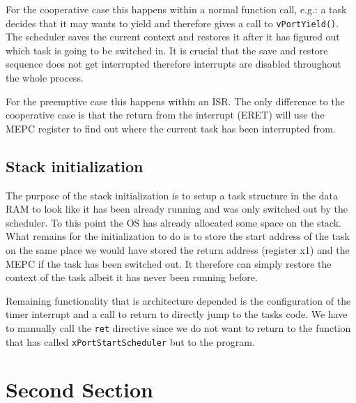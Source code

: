 
For the cooperative case this happens within a normal function call, e.g.: a task decides that it may wants to yield and therefore gives a call to \verb+vPortYield()+. The scheduler saves the current context and restores it after it has figured out which task is going to be switched in. It is crucial that the save and restore sequence does not get interrupted therefore interrupts are disabled throughout the whole process.

For the preemptive case this happens within an ISR. The only difference to the cooperative case is that the return from the interrupt (ERET) will use the MEPC register to find out where the current task has been interrupted from.

\subsection{Stack initialization}

The purpose of the stack initialization is to setup a task structure in the data RAM to look like it has been already running and was only switched out by the scheduler. To this point the OS has already allocated some space on the stack. What remains for the initialization to do is to store the start address of the task on the same place we would have stored the return address (register x1) and the MEPC if the task has been switched out. It therefore can simply restore the context of the task albeit it has never been running before.

Remaining functionality that is architecture depended is the configuration of the timer interrupt and a call to return to directly jump to the tasks code. We have to manually call the \verb+ret+ directive since we do not want to return to the function that has called \verb+xPortStartScheduler+ but to the program.


\section{Second Section}


